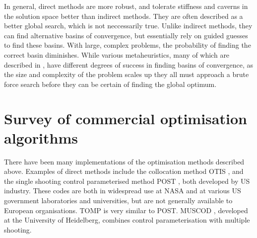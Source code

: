 



In general, direct methods are more robust, and tolerate stiffness and caverns in the solution space better than indirect methods. They are often described as a better global search, which is not neccessarily true. Unlike indirect methods, they can find alternative basins of convergence, but essentially rely on guided guesses to find these basins. With large, complex problems, the probability of finding the correct basin diminishes. While various metaheuristics, many of which are described in \textcite{Dreo2006}, have different degrees of success in finding basins of convergence, as the size and complexity of the problem scales up they all must approach a brute force search before they can be certain of finding the global optimum.




\section{Survey of commercial optimisation algorithms} \label{sec:Algorithms}

There have been many implementations of the optimisation methods described above. Examples of direct methods include the collocation method OTIS \parencite[Optimal Trajectories by Implicit Simulation, ][]{Hargraves1987}, and the single shooting control parameterised method POST \parencite[Program to Optimize Simulated Trajectories, ][]{Brauer1977}, both developed by US industry. These codes are both in widespread use at NASA and at various US government laboratories and universities, but are not generally available to European organisations. TOMP \parencite[Trajectory Optimization by Mathematical Programming, ][]{Kraft1994} is very similar to POST. MUSCOD \parencite[Multiple Shooting Code for optimization, ][]{Bock1984}, developed at the University of Heidelberg, combines control parameterisation with multiple shooting. 

